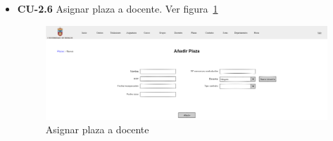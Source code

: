 \begin{itemize}
\begin{itemize}
		\FloatBarrier
		\item \textbf{CU-2.6} Asignar plaza a docente. Ver figura~\ref{F-CU2.6}
		\begin{figure}[!h]
		\centering
		\includegraphics[width=\textwidth]{../img/Anexos/Vistas/add_plaza.png}
		\caption{Asignar plaza a docente}\label{F-CU2.6}
		\end{figure}
		\FloatBarrier
	\end{itemize}
	

\end{itemize}
